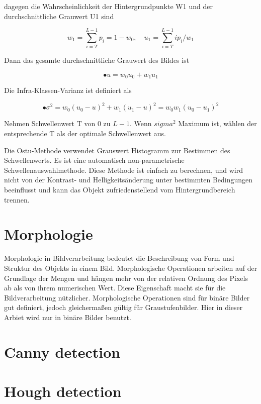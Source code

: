 dagegen die Wahrscheinlichkeit der Hintergrundpunkte W1 und der durchschnittliche Grauwert U1 sind

\begin{equation}
  w_{1} = \sum_{i=T}^{L-1} p_{i} = 1-w_{0},\quad u_{1} = \sum_{i=T}^{L-1} ip_{i}/w_{1}
\end{equation}

Dann das gesamte durchschnittliche Grauwert des Bildes ist

\begin{equation}
• u = w_{0}u_{0} + w_{1}u_{1}
\end{equation}

Die Infra-Klassen-Varianz ist definiert als

\begin{equation}
•\sigma^2 = w_{0}(u_{0} - u)^2 + w_{1}(u_{1} - u)^2 = w_{0}w_{1}(u_{0} - u_{1})^2
\end{equation}

Nehmen Schwellenwert T von 0 zu $ L-1 $. Wenn $ sigma^2 $ Maximum ist, wählen der entsprechende T als der optimale Schwellenwert aus.

Die Ostu-Methode verwendet Grauswert Histogramm zur Bestimmen des Schwellenwerts. Es ist eine automatisch non-parametrische Schwellenauswahlmethode. Diese Methode ist einfach zu berechnen, und wird nicht von der Kontrast- und Helligkeitsänderung unter bestimmten Bedingungen beeinflusst und kann das Objekt zufriedenstellend vom Hintergrundbereich trennen.

















\section{Morphologie}

Morphologie in Bildverarbeitung bedeutet die Beschreibung von Form und Struktur des Objekts in einem Bild. Morphologische Operationen arbeiten auf der Grundlage der Mengen und hängen mehr von der relativen Ordnung des Pixels ab als von ihrem numerischen Wert. Diese Eigenschaft macht sie für die Bildverarbeitung nützlicher. Morphologische Operationen sind für binäre Bilder gut definiert, jedoch gleichermaßen gültig für Graustufenbilder. Hier in dieser Arbiet wird nur in binäre Bilder benutzt.

 












\section{Canny detection}



\section{Hough detection}


